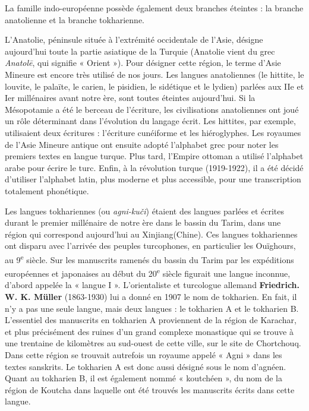 La famille indo-européenne possède également deux branches éteintes : la branche anatolienne et la branche tokharienne.

L’Anatolie, péninsule située à l’extrémité occidentale de l’Asie, désigne aujourd’hui toute la partie asiatique de la Turquie (Anatolie vient du grec \textit{Anatolē}, qui signifie « Orient »). Pour désigner cette région, le terme d’Asie Mineure est encore très utilisé de nos jours. Les langues anatoliennes (le hittite, le louvite, le palaïte, le carien, le pisidien, le sidétique et le lydien) parlées aux IIe et Ier millénaires avant notre ère, sont toutes éteintes aujourd’hui. Si la Mésopotamie a été le berceau de l’écriture, les civilisations anatoliennes ont joué un rôle déterminant dans l’évolution du langage écrit. Les hittites, par exemple, utilisaient deux écritures : l’écriture cunéiforme et les hiéroglyphes. Les royaumes de l’Asie Mineure antique ont ensuite adopté l’alphabet grec pour noter les premiers textes en langue turque. Plus tard, l’Empire ottoman a utilisé l’alphabet arabe pour écrire le turc. Enfin, à la révolution turque (1919-1922), il a été décidé d’utiliser l’alphabet latin, plus moderne et plus accessible, pour une transcription totalement phonétique.

Les langues tokhariennes (ou \textit{agni-kuči}) étaient des langues parlées et écrites durant le premier millénaire de notre ère dans le bassin du Tarim, dans une région qui correspond aujourd’hui au Xinjiang(Chine). Ces langues tokhariennes ont disparu avec l’arrivée des peuples turcophones, en particulier les Ouïghours, au 9\textsuperscript{e} siècle. Sur les manuscrits ramenés du bassin du Tarim par les expéditions européennes et japonaises au début du 20\textsuperscript{e} siècle figurait une langue inconnue, d’abord appelée la « langue I ». L’orientaliste et turcologue allemand \textbf{Friedrich. W. K. Müller} (1863-1930) lui a donné en 1907 le nom de tokharien. En fait, il n’y a pas une seule langue, mais deux langues : le tokharien A et le tokharien B. L’essentiel des manuscrits en tokharien A proviennent de la région de Karachar, et plus précisément des ruines d’un grand complexe monastique qui se trouve à une trentaine de kilomètres au sud-ouest de cette ville, sur le site de Chortchouq. Dans cette région se trouvait autrefois un royaume appelé « Agni » dans les textes sanskrits. Le tokharien A est donc aussi désigné sous le nom d’agnéen. Quant au tokharien B, il est également nommé « koutchéen », du nom de la région de Koutcha dans laquelle ont été trouvés les manuscrits écrits dans cette langue.

